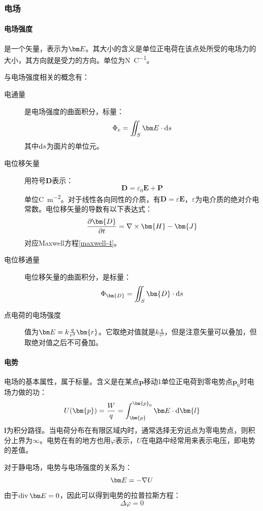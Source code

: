 \subsubsection{电场}
\paragraph*{电场强度} 是一个矢量，表示为$\bE$。其大小的含义是单位正电荷在该点处所受的电场力的大小，其方向就是受力的方向。单位为\si{N\per\coulomb}。

与电场强度相关的概念有：
\begin{description}
\item[电通量] 是电场强度的曲面积分，标量：
$$\Phi_e=\iint_S \bE\cdot\dif s$$
其中$\mathop{}\!\mathrm{d} s$为面片的单位元。
\item[电位移矢量] 用符号$\bm{D}$表示：
$$\bm{D}=\varepsilon_0\bm{E}+\bm{P}$$
单位\si{\coulomb\per\square\m}。对于线性各向同性的介质，有$\bm{D}=\varepsilon \bm{E}$，$\varepsilon$为电介质的绝对介电常数。电位移矢量的导数有以下表达式：
$$\pdv{\bm{D}}{t}=\nabla\times \bm{H}-\bm{J}$$
对应Maxwell方程\ref{maxwell-4}。
\item[电位移通量] 电位移矢量的曲面积分，是标量：
$$\Phi_{\bm{D}}=\iint_S\bm{D}\cdot\dif s$$ 
\item[点电荷的电场强度] 值为$\bE=k\frac{q}{r^3}\bm{r}$。它取绝对值就是$k\frac{q}{r^2}$，但是注意矢量可以叠加，但取绝对值之后不可叠加。
\end{description}
\paragraph*{电势}电场的基本属性，属于标量。含义是在某点$\bm{p}$移动1单位正电荷到零电势点$\bm{p}_0$时电场力做的功：
$$U(\bm{p})=\frac{W}{q}=\int_{\bm{p}}^{\bm{p}_0}\bE\cdot\dif \bm{l}$$
$\bm{l}$为积分路径。当电荷分布在有限区域内时，通常选择无穷远点为零电势点，则积分上界为$\infty$。电势在有的地方也用$\varphi$表示，$U$在电路中经常用来表示电压，即电势的差值。

对于静电场，电势与电场强度的关系为：
$$\bE=-\nabla U$$
由于$\vdiv \bE=0$，因此可以得到电势的拉普拉斯方程：
$$\Delta \varphi=0$$

